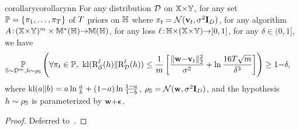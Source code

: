 \begin{restatable}{corollary}{corollarynn}\label{chap:dis-pra:corollary:nn} For any distribution $\mathcal{D}$ on $\mathbb{X}{\times}\mathbb{Y}$, for any set \mbox{$\mathbb{P}=\{\pi_1,\dots, \pi_T\}$} of $T$ priors on $\mathbb{H}$ where $\pi_t=\mathcal{N}(\mathbf{v}_t, \sigma^2\mathbf{I}_D)$, for any algorithm $A\!:\!(\mathbb{X}{\times}\mathbb{Y})^{m}\times\mathbb{M}^{*}(\mathbb{H}) {\rightarrow} \mathbb{M}(\mathbb{H})$, for any loss $\ell\!:\! \mathbb{H}{\times} (\mathbb{X}{\times}\mathbb{Y}) {\to} [0, 1]$, for any $\delta{\in}(0,1]$,
we have 
\begin{align*}
 \PP_{\S\sim\D^{\m}, \h\sim \AQ}\Bigg(\forall& \P_\t\in \priorset,\ \kl(\RiskLoss_{\dS}(\h)\| \RiskLoss_{\D}(\h))\le \frac{1}{\m}\left[ \frac{\|\wbf{-}\vbf_\t\|_{2}^{2}}{\sigma^2}+\ln\frac{16\iter\sqrt{\m}}{\delta^3}\right]\!\Bigg)\geq 1{-}\delta,
\end{align*}
where $\operatorname{kl}(a\|b) = a\ln\tfrac{a}{b}+(1{-}a)\ln\tfrac{1-a}{1-b}$, $\rho_{\mathbb{S}} = \mathcal{N}(\mathbf{w}, \sigma^2\mathbf{I}_D)$, and the hypothesis $h\sim\rho_{\mathbb{S}}$ is parameterized by $\mathbf{w}{+}\boldsymbol{\epsilon}$.
\end{restatable}
\begin{noaddcontents}\begin{proof}
Deferred to~.
\end{proof}\end{noaddcontents}

